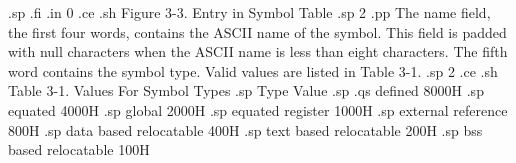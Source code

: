                 
.sp
.fi
.in 0
.ce
.sh
Figure 3-3.  Entry in Symbol Table
.sp 2
.pp
The name
field, the first four words, contains the ASCII name of the
symbol.  This field is padded with null characters when the ASCII
name is less than eight characters.  The fifth word contains the
symbol type.  Valid values are listed in Table 3-1. 
.sp 2
.ce
.sh
Table 3-1.  Values For Symbol Types
.sp 
                        Type                   Value
.sp 
.qs
                defined                        8000H
.sp
                equated                        4000H
.sp
                global                         2000H
.sp
                equated register               1000H
.sp
                external reference              800H
.sp
                data based relocatable          400H
.sp
                text based relocatable          200H
.sp
                bss based relocatable           100H

